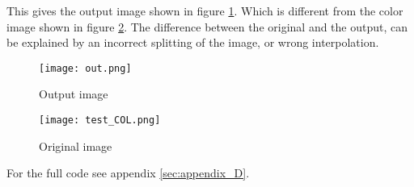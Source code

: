 This gives the output image shown in figure \ref{fig:output}. Which is different from the color image shown in figure \ref{fig:original}.
The difference between the original and the output, can be explained by an incorrect splitting of the image, or wrong interpolation.

\begin{figure}[ht]
\centering
\texttt{[image: out.png]}
\caption{Output image}
\label{fig:output}
\end{figure}

\begin{figure}[ht]
\centering
\texttt{[image: test\_COL.png]}
\caption{Original image}
\label{fig:original}
\end{figure}

For the full code see appendix \ref{sec:appendix_D}.